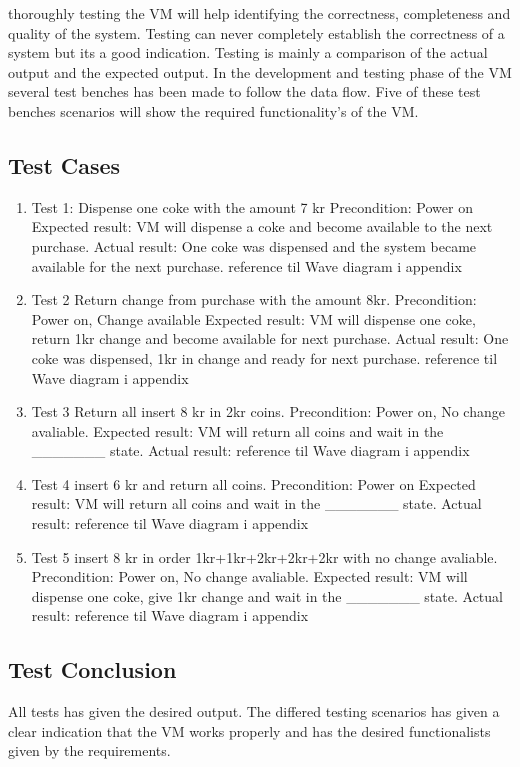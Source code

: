 thoroughly testing the VM will help identifying the correctness, completeness and quality of the system. Testing can never completely establish the correctness of a system but its a good indication. Testing is mainly a comparison of the actual output and the expected output.
In the development and testing phase of the VM several test benches has been made to follow the data flow. Five of these test benches scenarios will show the required functionality's of the VM.   

\subsection{Test Cases}
\begin{enumerate}

\item Test 1:  Dispense one coke with the amount 7 kr 
Precondition: Power on
Expected result: VM will dispense a coke and become available to the next purchase.
Actual result: One coke was dispensed and the system became available for the next purchase.
reference til Wave diagram i appendix

\item Test 2 Return change from purchase with the amount 8kr.
Precondition:  Power on, Change available 
Expected result:  VM will dispense one coke, return 1kr change and become available for next purchase.
Actual result: One coke was dispensed, 1kr in change and ready for next purchase.
reference til Wave diagram i appendix

\item Test 3 Return all insert 8 kr in 2kr coins.
Precondition:  Power on, No change avaliable.
Expected result: VM will return all coins and wait in the _______ state.
Actual result: 
reference til Wave diagram i appendix

\item Test 4 insert 6 kr and return all coins. 
Precondition:  Power on
Expected result: VM will return all coins and wait in the _______ state.
Actual result: 
reference til Wave diagram i appendix

\item Test 5 insert 8 kr in order 1kr+1kr+2kr+2kr+2kr with no change avaliable.
Precondition:  Power on, No change avaliable.
Expected result: VM will dispense one coke, give 1kr change and wait in the _______ state. 
Actual result: 
reference til Wave diagram i appendix

\end{enumerate}

\subsection{Test Conclusion}
All tests has given the desired output. The differed testing scenarios has given a clear indication that the VM works properly and has the desired functionalists given by the requirements.
